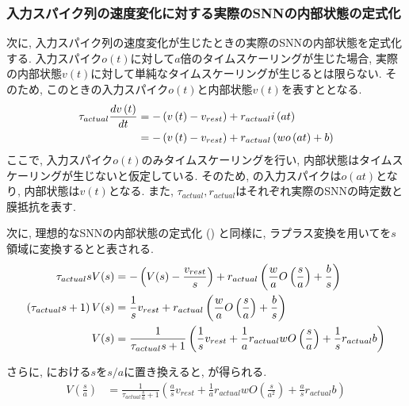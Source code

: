 \subsubsection{入力スパイク列の速度変化に対する実際のSNNの内部状態の定式化}
次に, 入力スパイク列の速度変化が生じたときの実際のSNNの内部状態を定式化する.
入力スパイク$o(t)$に対して$a$倍のタイムスケーリングが生じた場合, 実際の内部状態$v(t)$に対して単純なタイムスケーリングが生じるとは限らない.
そのため, このときの入力スパイク$o(t)$と内部状態$v(t)$を表すととなる.
\begin{align}
    \tau_{actual} \frac{dv\left(t\right)}{dt} &= -\left(v\left(t\right) - v_{rest}\right) + r_{actual} i\left(at\right) \notag \\
     &= -\left(v\left(t\right) - v_{rest}\right) + r_{actual} \left( wo\left(at\right) + b \right) \label{eq:actual:state}
\end{align}
ここで, 入力スパイク$o(t)$のみタイムスケーリングを行い, 内部状態はタイムスケーリングが生じないと仮定している.
そのため, の入力スパイクは$o(at)$となり, 内部状態は$v(t)$となる.
また, $\tau_{actual}, r_{actual}$はそれぞれ実際のSNNの時定数と膜抵抗を表す.

次に, 理想的なSNNの内部状態の定式化 () と同様に, ラプラス変換を用いてを$s$領域に変換するとと表される.
\begin{align}
    \tau_{actual} sV(s) &= - \left( V(s) - \frac{v_{rest}}{s} \right) + r_{actual} \left( \frac{w}{a} O\left(\frac{s}{a}\right) + \frac{b}{s} \right) \notag \\
    \left(\tau_{actual} s +1\right) V(s) &= \frac{1}{s} v_{rest} +r_{actual} \left( \frac{w}{a} O\left(\frac{s}{a}\right) + \frac{b}{s} \right) \notag \\
    V(s) &=  \frac{1}{\tau_{actual} s +1}\left( \frac{1}{s} v_{rest} +\frac{1}{a} r_{actual} w O\left(\frac{s}{a}\right) + \frac{1}{s} r_{actual} b \right) \label{eq:actual:state:laplace}
\end{align}

さらに, における$s$を$s/a$に置き換えると, が得られる.
\begin{align}
    V\left(\frac{s}{a}\right) &=  \frac{1}{\tau_{actual} \frac{s}{a} +1}\left( \frac{a}{s} v_{rest} +\frac{1}{a} r_{actual} w O\left(\frac{s}{a^2}\right) + \frac{a}{s} r_{actual} b \right) \label{eq:actual:state:laplace2}
\end{align}


